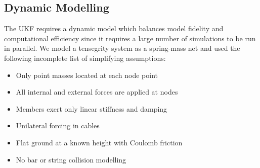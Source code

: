 {\subsection{Dynamic Modelling} 

The UKF requires a dynamic model which balances model fidelity and computational efficiency since it requires a large number of simulations to be run in parallel. 
We model a tensegrity system as a spring-mass net and used the following incomplete list of simplifying assumptions:
\begin{itemize}
  \item Only point masses located at each node point
  \item All internal and external forces are applied at nodes
  \item Members exert only linear stiffness and damping
  \item Unilateral forcing in cables
  \item Flat ground at a known height with Coulomb friction
  \item No bar or string collision modelling
\end{itemize}

}
